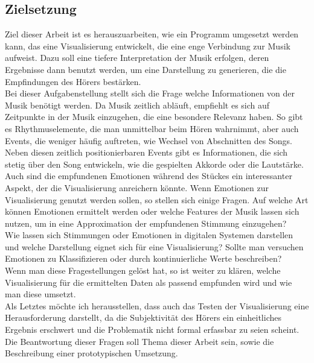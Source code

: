 \documentclass[11pt,a4paper]{article}
\begin{document}
\subsection{Zielsetzung}
Ziel dieser Arbeit ist es herauszuarbeiten, wie ein Programm umgesetzt werden kann, das eine Visualisierung entwickelt, die eine enge Verbindung zur Musik aufweist. Dazu soll eine tiefere Interpretation der Musik erfolgen, deren Ergebnisse dann benutzt werden, um eine Darstellung zu generieren, die die Empfindungen des Hörers bestärken.\\
Bei dieser Aufgabenstellung stellt sich die Frage welche Informationen von der Musik benötigt werden. Da Musik zeitlich abläuft, empfiehlt es sich auf Zeitpunkte in der Musik einzugehen, die eine besondere Relevanz haben. So gibt es Rhythmuselemente, die man unmittelbar beim Hören wahrnimmt, aber auch Events, die weniger häufig auftreten, wie Wechsel von Abschnitten des Songs. Neben diesen zeitlich positionierbaren Events gibt es Informationen, die sich stetig über den Song entwickeln, wie die gespielten Akkorde oder die Lautstärke.\\
Auch sind die empfundenen Emotionen während des Stückes ein interessanter Aspekt, der die Visualisierung anreichern könnte.
Wenn Emotionen zur Visualisierung genutzt werden sollen, so stellen sich einige Fragen. Auf welche Art können Emotionen ermittelt werden oder welche Features der Musik lassen sich nutzen, um in eine Approximation der empfundenen Stimmung einzugehen?\\
Wie lassen sich Stimmungen oder Emotionen in digitalen Systemen darstellen und welche Darstellung eignet sich für eine Visualisierung? Sollte man versuchen Emotionen zu Klassifizieren oder durch kontinuierliche Werte beschreiben?\\
Wenn man diese Fragestellungen gelöst hat, so ist weiter zu klären, welche Visualisierung für die ermittelten Daten als passend empfunden wird und wie man diese umsetzt.\\
Als Letztes möchte ich herausstellen, dass auch das Testen der Visualisierung eine Herausforderung darstellt, da die Subjektivität des Hörers ein einheitliches Ergebnis erschwert und die Problematik nicht formal erfassbar zu seien scheint. Die Beantwortung dieser Fragen soll Thema dieser Arbeit sein, sowie die Beschreibung einer prototypischen Umsetzung.
\end{document}
